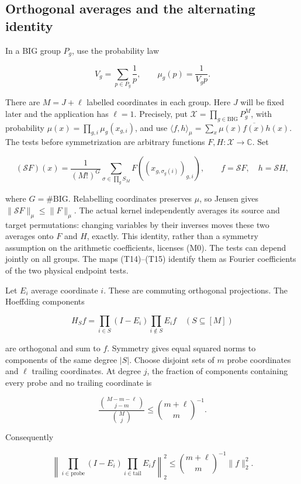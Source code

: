 \hypertarget{marked-correlation-orthogonal-averages-and-the-alternating-identity}{%
\subsection{Orthogonal averages and the alternating
identity}\label{marked-correlation-orthogonal-averages-and-the-alternating-identity}}

In a BIG group \(P_g\), use the probability law

\[
V_g=\sum_{p\in P_g}\frac1p,
\qquad \mu_g(p)=\frac1{V_gp}.
\]

There are \(M=J+\ell\) labelled coordinates in each group. Here \(J\)
will be fixed later and the application has \(\ell=1\). Precisely, put
\(\mathcal X=\prod_{g\in\mathrm{BIG}}P_g^M\), with probability
\(\mu(x)=\prod_{g,i}\mu_g(x_{g,i})\), and use
\(\langle f,h\rangle_\mu=\sum_x\mu(x)\overline{f(x)}h(x)\). The tests
before symmetrization are arbitrary functions
\(F,H:\mathcal X\to\mathbb C\). Set

\[
(\mathcal SF)(x)=\frac1{(M!)^{G}}
 \sum_{\sigma\in\prod_g S_M}F((x_{g,\sigma_g(i)})_{g,i}),
\qquad f=\mathcal SF,\quad h=\mathcal SH,
\tag{M0}
\]

where \(G=\#\mathrm{BIG}\). Relabelling coordinates preserves \(\mu\),
so Jensen gives \(\|\mathcal SF\|_\mu\le\|F\|_\mu\). The actual kernel
independently averages its source and target permutations: changing
variables by their inverses moves these two averages onto \(F\) and
\(H\), exactly. This identity, rather than a symmetry assumption on the
arithmetic coefficients, licenses (M0). The tests can depend jointly on
all groups. The maps (T14)--(T15) identify them as Fourier coefficients
of the two physical endpoint tests.

Let \(E_i\) average coordinate \(i\). These are commuting orthogonal
projections. The Hoeffding components

\[
H_Sf=\prod_{i\in S}(I-E_i)\prod_{i\notin S}E_i f
\quad(S\subseteq[M])
\]

are orthogonal and sum to \(f\). Symmetry gives equal squared norms to
components of the same degree \(|S|\). Choose disjoint sets of \(m\)
probe coordinates and \(\ell\) trailing coordinates. At degree \(j\),
the fraction of components containing every probe and no trailing
coordinate is

\[
\frac{\binom{M-m-\ell}{j-m}}{\binom Mj}
\le\binom{m+\ell}{m}^{-1}.
\]

Consequently

\[
\left\|\prod_{i\in\mathrm{probe}}(I-E_i)
             \prod_{i\in\mathrm{tail}}E_i f\right\|_2^2
\le\binom{m+\ell}{m}^{-1}\|f\|_2^2. \tag{M1}
\]

